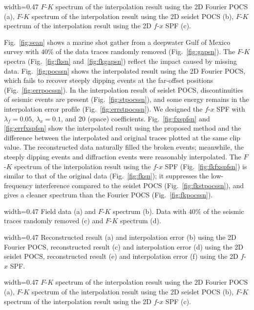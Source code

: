  {width=0.47\columnwidth}
{$F$-$K$ spectrum of the interpolation result using the 2D Fourier
  POCS (a), $F$-$K$ spectrum of the interpolation result using the 2D
  seislet POCS (b), $F$-$K$ spectrum of the interpolation result using
  the 2D $f$-$x$ SPF (c).}

Fig.~\ref{fig:sean} shows a marine shot gather from a deepwater Gulf
of Mexico survey with $40\%$ of the data traces randomly removed
(Fig.~\ref{fig:gapsn}).  The $F$-$K$ spectra (Fig.~\ref{fig:fksn}
and~\ref{fig:fkgapsn}) reflect the impact caused by missing data.
Fig.~\ref{fig:pocssn} shows the interpolated result using the 2D
Fourier POCS, which fails to recover steeply dipping events at the
far-offset positions (Fig.~\ref{fig:errpocssn}).  In the interpolation
result of seislet POCS, discontinuities of seismic events are present
(Fig.~\ref{fig:stpocssn}), and some energy remains in the
interpolation error profile (Fig.~\ref{fig:errstpocssn}).  We designed
the $f$-$x$ SPF with $\lambda_{f}=0.05$, $\lambda_{x}=0.1$, and 20
(space) coefficients. Fig.~\ref{fig:fxspfsn} and \ref{fig:errfxspfsn}
show the interpolated result using the proposed method and the
difference between the interpolated and original traces plotted at the
same clip value. The reconstructed data naturally filled the broken
events; meanwhile, the steeply dipping events and diffraction events
were reasonably interpolated.  The $F$-$K$ spectrum of the
interpolation result using the $f$-$x$ SPF (Fig.~\ref{fig:fkfxspfsn})
is similar to that of the original data (Fig.~\ref{fig:fksn}); it
suppresses the low-frequency interference compared to the seislet POCS
(Fig.~\ref{fig:fkstpocssn}), and gives a cleaner spectrum than the
Fourier POCS (Fig.~\ref{fig:fkpocssn}).

 {width=0.47\columnwidth} {Field
  data (a) and $F$-$K$ spectrum (b). Data with $40\%$ of the seismic
  traces randomly removed (c) and $F$-$K$ spectrum (d).}

{width=0.47\columnwidth} {Reconstructed result (a) and interpolation
  error (b) using the 2D Fourier POCS, reconstructed result (c) and
  interpolation error (d) using the 2D seislet POCS, reconstructed
  result (e) and interpolation error (f) using the 2D $f$-$x$ SPF.}

 {width=0.47\columnwidth}
{$F$-$K$ spectrum of the interpolation result using the 2D Fourier
  POCS (a), $F$-$K$ spectrum of the interpolation result using the 2D
  seislet POCS (b), $F$-$K$ spectrum of the interpolation result using
  the 2D $f$-$x$ SPF (c).}

